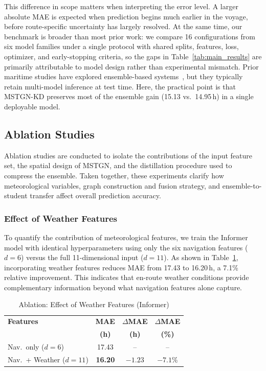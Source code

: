 \documentclass[conference]{IEEEtran}
\begin{document}
This difference in scope matters when interpreting the error level. A larger absolute MAE is expected when prediction begins much earlier in the voyage, before route-specific uncertainty has largely resolved. At the same time, our benchmark is broader than most prior work: we compare 16 configurations from six model families under a single protocol with shared splits, features, loss, optimizer, and early-stopping criteria, so the gaps in Table~\ref{tab:main_results} are primarily attributable to model design rather than experimental mismatch. Prior maritime studies have explored ensemble-based systems~\cite{saberHighaccuracyPredictionVessels2025,chuVesselArrivalTime2025}, but they typically retain multi-model inference at test time. Here, the practical point is that MSTGN-KD preserves most of the ensemble gain (15.13 vs.\ 14.95\,h) in a single deployable model.




\subsection{Ablation Studies}
\label{sec:ablations}

Ablation studies are conducted to isolate the contributions of the input feature set, the spatial design of MSTGN, and the distillation procedure used to compress the ensemble. Taken together, these experiments clarify how meteorological variables, graph construction and fusion strategy, and ensemble-to-student transfer affect overall prediction accuracy.

\subsubsection{Effect of Weather Features}

To quantify the contribution of meteorological features, we train the Informer model with identical hyperparameters using only the six navigation features ($d = 6$) versus the full 11-dimensional input ($d = 11$). As shown in Table~\ref{tab:ablation_weather}, incorporating weather features reduces MAE from 17.43 to 16.20\,h, a 7.1\% relative improvement. This indicates that en-route weather conditions provide complementary information beyond what navigation features alone capture.

\begin{table}[t]
    \centering
    \caption{Ablation: Effect of Weather Features (Informer)}
    \label{tab:ablation_weather}
    \footnotesize
    \begin{tabular}{lccc}
        \toprule
        \textbf{Features} & \textbf{MAE} & $\Delta$\textbf{MAE} & $\Delta$\textbf{MAE} \\
        & \textbf{(h)} & \textbf{(h)} & \textbf{(\%)} \\
        \midrule
        Nav.\ only ($d=6$) & 17.43 & -- & -- \\
        Nav.\ + Weather ($d=11$) & \textbf{16.20} & $-1.23$ & $-7.1\%$ \\
        \bottomrule
    \end{tabular}
\end{table}
\end{document}
